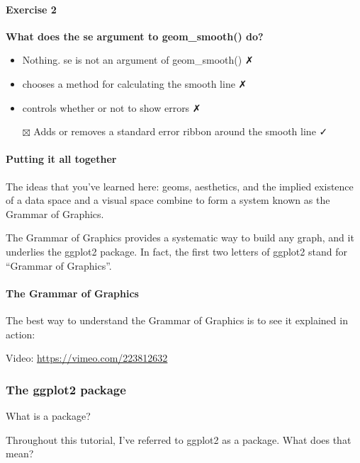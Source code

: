 \documentclass[
]{article}
\providecommand{\tightlist}{%
  \setlength{\itemsep}{0pt}\setlength{\parskip}{0pt}}
\begin{document}
\hypertarget{exercise-2-2}{%
\paragraph{Exercise 2}\label{exercise-2-2}}

\textbf{What does the se argument to geom\_smooth() do?}

\begin{itemize}
\tightlist
\item
  Nothing. se is not an argument of geom\_smooth() ✗
\item
  chooses a method for calculating the smooth line ✗
\item
  controls whether or not to show errors ✗
\item[$\boxtimes$]
  Adds or removes a standard error ribbon around the smooth line ✓
\end{itemize}

\hypertarget{putting-it-all-together}{%
\paragraph{Putting it all together}\label{putting-it-all-together}}

The ideas that you've learned here: geoms, aesthetics, and the implied
existence of a data space and a visual space combine to form a system
known as the Grammar of Graphics.

The Grammar of Graphics provides a systematic way to build any graph,
and it underlies the ggplot2 package. In fact, the first two letters of
ggplot2 stand for ``Grammar of Graphics''.

\hypertarget{the-grammar-of-graphics}{%
\paragraph{The Grammar of Graphics}\label{the-grammar-of-graphics}}

The best way to understand the Grammar of Graphics is to see it
explained in action:

Video: \url{https://vimeo.com/223812632}

\hypertarget{the-ggplot2-package}{%
\subsubsection{The ggplot2 package}\label{the-ggplot2-package}}

What is a package?

Throughout this tutorial, I've referred to ggplot2 as a package. What
does that mean?
\end{document}
